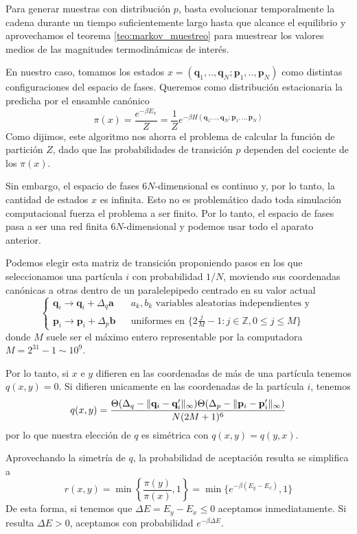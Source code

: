 Para generar muestras con distribución $p$, basta evolucionar temporalmente la cadena durante un tiempo suficientemente largo hasta que alcance el equilibrio y
aprovechamos el teorema \ref{teo:markov_muestreo} para muestrear los valores medios de las magnitudes termodinámicas de interés.

En nuestro caso, tomamos los estados $x = (\mathbf{q}_1,..,\mathbf{q}_N;\mathbf{p}_1,..,\mathbf{p}_N)$ como distintas configuraciones del espacio de fases.
Queremos como distribución estacionaria la predicha por el ensamble canónico \[\pi(x) = \frac{e^{-\beta E_x}}{Z} = \frac{1}{Z}e^{-\beta H(\mathbf{q}_1,..,\mathbf{q}_N;\mathbf{p}_1,..,\mathbf{p}_N)}\]
Como dijimos, este algoritmo nos ahorra el problema de calcular la función de partición $Z$, dado que las probabilidades de transición $p$ dependen del cociente de los $\pi(x)$.

Sin embargo, el espacio de fases $6N$-dimensional es continuo y, por lo tanto, la cantidad de estados $x$ es infinita.
Esto no es problemático dado toda simulación computacional fuerza el problema a ser finito.
Por lo tanto, el espacio de fases pasa a ser una red finita $6N$-dimensional y podemos usar todo el aparato anterior.

Podemos elegir esta matriz de transición proponiendo pasos en los que seleccionamos una partícula $i$ con probabilidad $1/N$, moviendo sus coordenadas canónicas a otras dentro de un paralelepipedo
centrado en su valor actual
\[
\left\{\begin{matrix}
\mathbf{q}_i \to  \mathbf{q}_i + \Delta_q \mathbf{a} & & a_k,b_k \text{ variables aleatorias independientes y }  \\
\mathbf{p}_i \to  \mathbf{p}_i + \Delta_p \mathbf{b} & &  \text{uniformes en } \{2\frac{j}{M}-1: j\in\mathbb{Z}, 0 \leq j \leq M\}
\end{matrix}\right.\]
donde $M$ suele ser el máximo entero representable por la computadora $M = 2^{31}-1\sim 10^9$.

Por lo tanto, si $x$ e $y$ difieren en las coordenadas de más de una partícula tenemos $q(x,y)=0$.
Si difieren unicamente en las coordenadas de la partícula $i$, tenemos
\[q(x,y) = \frac{\Theta(\Delta_q - \Arrowvert \mathbf{q}_i - \mathbf{q}_i' \Arrowvert_\infty)\Theta(\Delta_p - \Arrowvert \mathbf{p}_i - \mathbf{p}_i' \Arrowvert_\infty)}{N(2M+1)^6}\]
por lo que nuestra elección de $q$ es simétrica con $q(x,y) = q(y,x)$.

Aprovechando la simetría de $q$, la probabilidad de aceptación resulta se simplifica a
\[r(x,y) = \min\left\{\frac{\pi(y)}{\pi(x)}, 1\right\} = \min\{e^{-\beta(E_y-E_x)}, 1\}\]
De esta forma, si tenemos que $\Delta E = E_y - E_x \leq 0$ aceptamos inmediatamente. Si resulta $\Delta E > 0$, aceptamos con probabilidad $e^{-\beta\Delta E}$.


